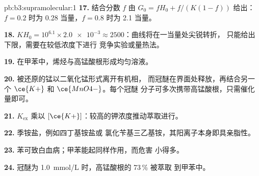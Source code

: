 \begin{solution}{pb:b3:supramolecular:1}
\textbf{17.} 结合分数 $f$ 由 $G_0 = fH_0 + f/(K(1 - f))$ 给出：$f = 0.2$ 时为 0.28 当量，$f = 0.8$ 时为 2.1 当量。

\textbf{18.} $KH_0 = 10^{6.1} \times \num{2.0e-3} \approx 2500$：曲线将在一当量处尖锐转折，
只能给出下限，需要在较低浓度下进行
竞争实验或量热法。

\textbf{19.} 在甲苯中，烯烃与高锰酸根形成均匀溶液。

\textbf{20.} 被还原的锰以二氧化锰形式离开有机相，
而冠醚在界面处释放，再结合另一个 $\ce{K+}$ 和 $\ce{MnO4-}$。每个冠醚
分子可多次携带高锰酸根，只需催化量即可。

\textbf{21.} $K_{\mathrm{ex}}$ 乘以 $[\ce{K+}]$：较高的钾浓度推动萃取进行。

\textbf{22.} 季铵盐，例如四丁基铵盐或
氯化苄基三乙基铵，其阳离子本身即具亲脂性。

\textbf{23.} 苯可致白血病；甲苯能起同样作用，而危害
小得多。

\textbf{24.} 冠醚为 \qty{1.0}{mmol/L} 时，高锰酸根的 73\,\% 被萃取
到甲苯中。
\end{solution}
